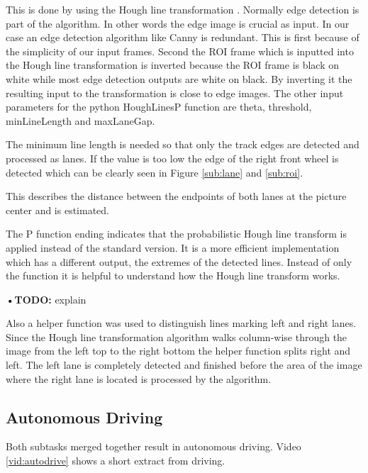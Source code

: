 \documentclass[conference]{IEEEtran}
\begin{document}
This is done by using the Hough line transformation \cite{Hough1962}.
Normally edge detection is part of the algorithm.
In other words the edge image is crucial as input.
In our case an edge detection algorithm like Canny is redundant.
This is first because of the simplicity of our input frames.
Second the ROI frame which is inputted into the Hough line transformation is inverted because the ROI frame is black on white while most edge detection outputs are white on black.
By inverting it the resulting input to the transformation is close to edge images.
The other input parameters for the python HoughLinesP function are theta, threshold, minLineLength and maxLaneGap.
\begin{description}
	\setlength\itemsep{.25em}
	\item[minLineLength] The minimum line length is needed so that only the track edges are detected and processed as lanes. If the value is too low the edge of the right front wheel is detected which can be clearly seen in Figure \ref{sub:lane} and \ref{sub:roi}. 
	\item[maxLineGap] This describes the distance between the endpoints of both lanes at the picture center and is estimated.
\end{description}

The P function ending indicates that the probabilistic Hough line transform is applied instead of the standard version.
It is a more efficient implementation which has a different output, the extremes of the detected lines.
Instead of only the function it is helpful to understand how the Hough line transform works.

\textbf{•TODO:} {explain}

Also a helper function was used to distinguish lines marking left and right lanes.
Since the Hough line transformation algorithm walks column-wise through the image from the left top to the right bottom the helper function splits right and left.
The left lane is completely detected and finished before the area of the image where the right lane is located is processed by the algorithm.

\subsection{Autonomous Driving}

Both subtasks merged together result in autonomous driving.
Video \ref{vid:autodrive} shows a short extract from driving.
\end{document}
